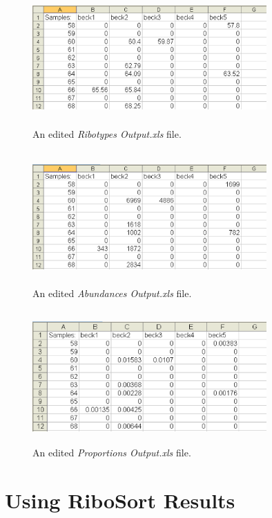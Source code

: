 \documentclass[a4paper]{article}
\begin{document}
\begin{figure}
\centering
\includegraphics[width=0.8\textwidth,height=2in]{EPS/picribo.eps}
\caption{An edited \textit{Ribotypes Output.xls} file.}
\label{fig:ribo}
\end{figure}

\begin{figure}
\centering
\includegraphics[width=0.8\textwidth,height=2in]{EPS/picabund.eps}
\caption{An edited \textit{Abundances Output.xls} file.}
\label{fig:abund}
\end{figure}

\begin{figure}
\centering
\includegraphics[width=0.8\textwidth,height=2in]{EPS/picprop.eps}
\caption{An edited \textit{Proportions Output.xls} file.}
\label{fig:prop}
\end{figure}

\section{Using RiboSort Results}
\end{document}
